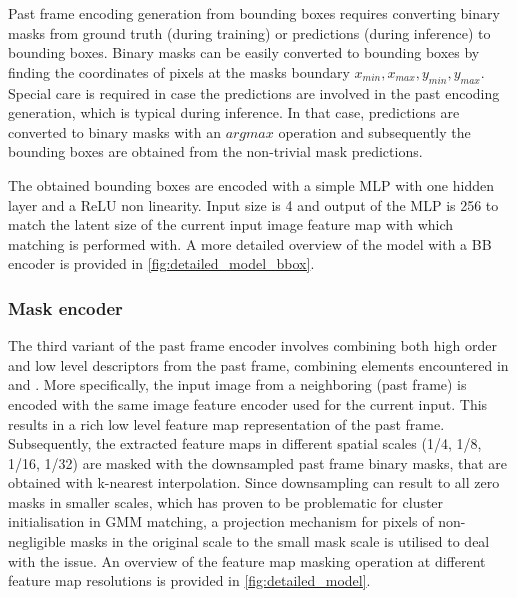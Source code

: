 Past frame encoding generation from bounding boxes requires converting binary masks from ground truth (during training) or predictions (during inference) to bounding boxes. Binary masks can be easily converted to bounding boxes by finding the coordinates of pixels at the masks boundary  $x_{min}, x_{max}, y_{min}, y_{max}$. Special care is required in case the predictions are involved in the past encoding generation, which is typical during inference. In that case, predictions are converted to binary masks with an $argmax$ operation and subsequently the bounding boxes are obtained from the non-trivial mask predictions.\par

The obtained bounding boxes are encoded with a simple MLP with one hidden layer and a ReLU non linearity. Input size is 4 and output of the MLP is 256 to match the latent size of the current input image feature map with which matching is performed with. A more detailed overview of the model with a BB encoder is provided in \figref\ref{fig:detailed_model_bbox}. \par


\subsubsection{Mask encoder}

The third variant of the past frame encoder involves combining both high order and low level descriptors from the past frame, combining elements encountered in \parencite{stm} and \parencite{athar2022hodor}. More specifically, the input image from a neighboring (past frame) is encoded with the same image feature encoder used for the current input. This results in a rich low level feature map representation of the past frame. Subsequently, the extracted feature maps in different spatial scales (1/4, 1/8, 1/16, 1/32) are masked with the downsampled past frame binary masks, that are obtained with k-nearest interpolation. Since downsampling can result to all zero masks in smaller scales, which has proven to be problematic for cluster initialisation in GMM matching, a projection mechanism for pixels of non-negligible masks in the original scale to the small mask scale is utilised to deal with the issue. An overview of the feature map masking operation at different feature map resolutions is provided in \figref\ref{fig:detailed_model}.\par



